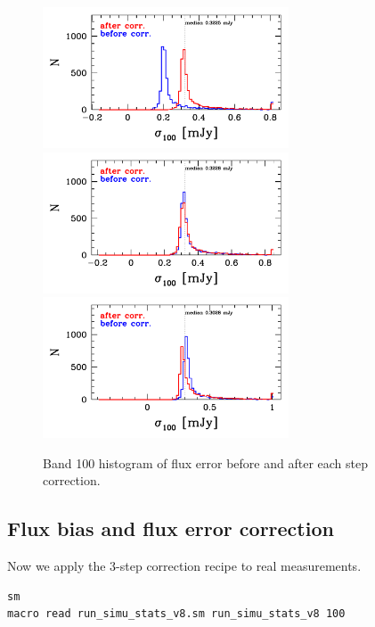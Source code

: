 \documentclass[11pt,a4paper]{article}
\begin{document}
\begin{figure}[H]
	\caption{
		Band 100 histogram of flux error before and after each step correction. 
	}
	\includegraphics[width=0.65\textwidth]{galsim_100_hist_uncertainty_1}
	\includegraphics[width=0.65\textwidth]{galsim_100_hist_uncertainty_2}
	\includegraphics[width=0.65\textwidth]{galsim_100_hist_uncertainty_3}
\end{figure}


\subsection{Flux bias and flux error correction}
\label{Band100_dfcorr}

Now we apply the 3-step correction recipe to real measurements. 

\begin{lstlisting}[language=bash]
sm
macro read run_simu_stats_v8.sm run_simu_stats_v8 100
\end{lstlisting}

\end{document}
